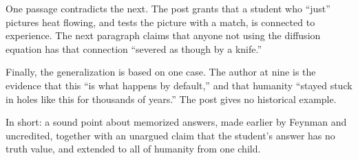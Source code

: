 \begin{afterword}
One passage contradicts the next. The post grants that a student who ``just'' pictures heat flowing, and tests the picture with a match, is connected to experience. The next paragraph claims that anyone not using the diffusion equation has that connection ``severed as though by a knife.''

Finally, the generalization is based on one case. The author at nine is the evidence that this ``is what happens by default,'' and that humanity ``stayed stuck in holes like this for thousands of years.'' The post gives no historical example.

In short: a sound point about memorized answers, made earlier by Feynman and uncredited, together with an unargued claim that the student's answer has no truth value, and extended to all of humanity from one child.
\end{afterword}

